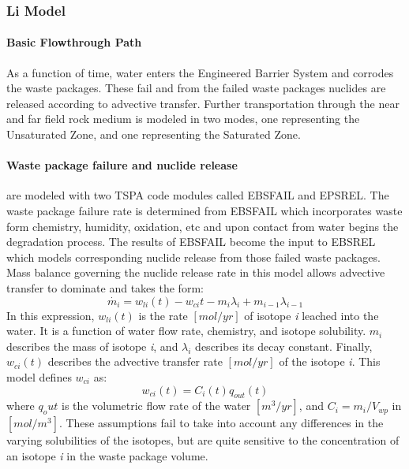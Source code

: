\subsubsection{Li Model\cite{li_methodology_2006}}

\paragraph{Basic Flowthrough Path}
As a function of time, water enters the Engineered Barrier System and 
corrodes the waste packages.  These fail and from the failed waste 
packages nuclides are released according to advective transfer.  
Further transportation through the near and far field rock medium is 
modeled in two modes, one representing the Unsaturated Zone, and one 
representing the Saturated Zone.

\paragraph{Waste package failure and nuclide release} are modeled with 
two TSPA code modules called EBSFAIL and EPSREL. The waste package 
failure rate is determined from EBSFAIL which incorporates waste form 
chemistry, humidity, oxidation, etc and upon contact from water begins 
the degradation process. The results of EBSFAIL become the input to 
EBSREL which models corresponding nuclide release from those failed 
waste packages. Mass balance governing the nuclide release rate in 
this model allows advective transfer to dominate and takes the form:
\begin{equation}
\dot{m_i}=w_{li}(t)-w_{ci}{t}-m_i\lambda_i+m_{i-1}\lambda_{i-1}\nonumber
\end{equation}
In this expression, $w_{li}(t)$ is the rate $[mol/yr]$ of isotope 
\emph{i} leached into the water.  It is a function of water flow rate, 
chemistry, and isotope solubility. $m_i$ describes the mass of isotope 
\emph{i}, and $\lambda_i$ describes its decay constant. Finally, 
$w_{ci}(t)$ describes the advective transfer rate $[mol/yr]$ of the 
isotope \emph{i}. This model defines $w_{ci}$ as:
\begin{equation}
w_{ci}(t)=C_i(t)q_{out}(t)
\end{equation} where $q_out$ is the volumetric flow rate of the water 
$[m^3/yr]$, and $C_i = m_i/V_{wp}$ in $[mol/m^3]$. These assumptions 
fail to take into account any differences in the varying solubilities 
of the isotopes, but are quite sensitive to the concentration of an 
isotope \emph{i} in the waste package volume.  

